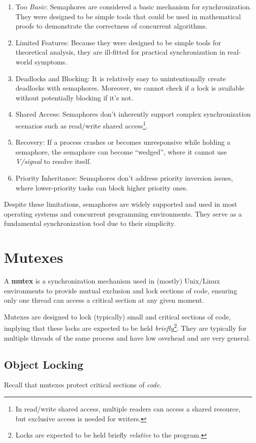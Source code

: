 \documentclass{report}
\newcommand{\definitionBegin}[1]{\begin{tcolorbox}[title={Definition: #1}]}
\newcommand{\definitionEnd}{\end{tcolorbox}}
\begin{document}
\begin{enumerate}[label=\textit{(\roman*)}]
\item Too \textit{Basic}: Semaphores are considered a basic mechanism for synchronization. They were
  designed to be simple tools that could be used in mathematical proofs to demonstrate the
  correctness of concurrent algorithms.
\item Limited Features: Because they were designed to be simple tools for theoretical analysis, they are
  ill-fitted for practical synchronization in real-world symptoms.
\item Deadlocks and Blocking: It is relatively easy to unintentionally create deadlocks with
  semaphores. Moreover, we cannot check if a lock is available without potentially blocking if
  it's not.
\item Shared Access: Semaphores don't inherently support complex synchronization scenarios such as
  read/write shared access\footnote{In read/write shared access, multiple readers can access a
    shared resource, but exclusive access is needed for writers.}.
\item Recovery: If a process crashes or becomes unresponsive while holding a semaphore, the
  semaphore can become ``wedged'', where it cannot use \textit{V/signal} to resolve itself.
\item Priority Inheritance: Semaphores don't address priority inversion issues, where lower-priority
  tasks can block higher priority ones.
\end{enumerate}
Despite these limitations, semaphores are widely supported and used in most operating systems and
concurrent programming environments. They serve as a fundamental synchronization tool due to their simplicity.





\section{Mutexes}
\definitionBegin{Mutex}
A \textbf{mutex} is a synchronization mechanism used in (mostly) Unix/Linux environments to provide
mutual exclusion and lock sections of code, ensuring only one thread can access a critical section
at any given moment. 
\definitionEnd

Mutexes are designed to lock (typically) small and critical sections of code, implying that these locks
are expected to be held \textit{briefly}\footnote{Locks are expected to be held briefly
  \textit{relative} to the program.}. They are typically for multiple threads of the same process
and have low overhead and are very general.


\subsection{Object Locking}
Recall that mutexes protect critical sections of \textit{code}. 
\end{document}
